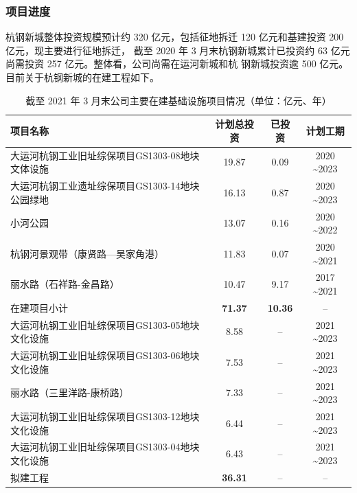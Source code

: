 \documentclass[H:\workspace\担保人财务信息2\杭州大运河\HangZhouText.tex]{subfiles}
\begin{document}
\subsubsection{项目进度}
杭钢新城整体投资规模预计约 320 亿元，包括征地拆迁 120 亿元和基建投资 200 亿元，现主要进行征地拆迁，
截至 2020 年 3 月末杭钢新城累计已投资约 63 亿元 尚需投资 257 亿元。整体看，公司尚需在运河新城和杭
钢新城投资逾 500 亿元。目前关于杭钢新城的在建工程如下。  
\begin{table}[H]
    \centering 
    \xiaowuhao 
    \setlength{\tabcolsep}{1.2em} %
    {\renewcommand{\arraystretch}{0.5} %
    \begin{tabular}{@{}l|c|c|c@{}}
        \toprule 
        项目名称 & 计划总投资 & 已投资 & 计划工期 \\
        \midrule 
        大运河杭钢工业旧址综保项目GS1303-08地块文体设施 & 19.87 & 0.09 & 2020 \textasciitilde 2023 \\
        大运河杭钢工业遗址综保项目GS1303-14地块公园绿地 & 16.13 & 0.87 & 2020 \textasciitilde 2023 \\
        小河公园 & 13.07 & 0.16 & 2020 \textasciitilde 2022 \\
        杭钢河景观带（康贤路—吴家角港） & 11.83 & 0.07 & 2020 \textasciitilde 2021 \\
        丽水路（石祥路-金昌路） & 10.47 & 9.17 & 2017 \textasciitilde 2021 \\
        \midrule
        在建项目小计 & \textbf{71.37} & \textbf{10.36} & -- \\
        \midrule 
        大运河杭钢工业旧址综保项目GS1303-05地块文化设施 & 8.58 & -- & 2021 \textasciitilde 2023 \\
        大运河杭钢工业旧址综保项目GS1303-06地块文化设施 & 7.53 & -- & 2021 \textasciitilde 2023 \\
        丽水路（三里洋路-康桥路） & 7.33 & -- & 2021 \textasciitilde 2023 \\
        大运河杭钢工业旧址综保项目GS1303-12地块文化设施 & 6.44 & -- & 2021 \textasciitilde 2023 \\
        大运河杭钢工业旧址综保项目GS1303-04地块文化设施 & 6.43 & -- & 2021 \textasciitilde 2023 \\
        \midrule 
        拟建工程 & \textbf{36.31} & -- & -- \\
        \bottomrule 
    \end{tabular}
    }
    \caption{截至 2021 年 3 月末公司主要在建基础设施项目情况（单位：亿元、年）}
\end{table}
\end{document}
